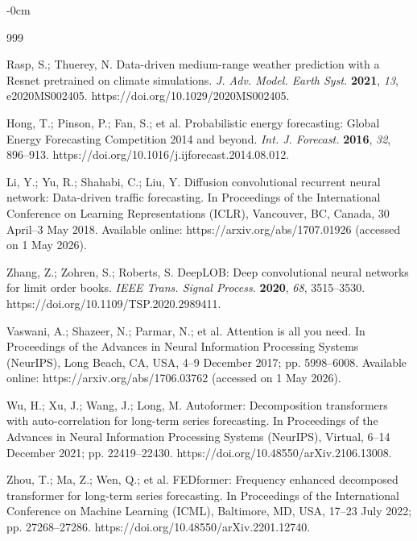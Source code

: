 \documentclass[electronics,article,submit,pdftex,moreauthors]{Definitions/mdpi}
\begin{document}
\begin{adjustwidth}{-\extralength}{0cm}


\begin{thebibliography}{999}

Rasp, S.; Thuerey, N. Data-driven medium-range weather prediction with a Resnet pretrained on climate simulations. \textit{J. Adv. Model. Earth Syst.} \textbf{2021}, \textit{13}, e2020MS002405. https://doi.org/10.1029/2020MS002405.

Hong, T.; Pinson, P.; Fan, S.; et al. Probabilistic energy forecasting: Global Energy Forecasting Competition 2014 and beyond. \textit{Int. J. Forecast.} \textbf{2016}, \textit{32}, 896--913. https://doi.org/10.1016/j.ijforecast.2014.08.012.

Li, Y.; Yu, R.; Shahabi, C.; Liu, Y. Diffusion convolutional recurrent neural network: Data-driven traffic forecasting. In Proceedings of the International Conference on Learning Representations (ICLR), Vancouver, BC, Canada, 30 April--3 May 2018. Available online: https://arxiv.org/abs/1707.01926 (accessed on 1 May 2026).

Zhang, Z.; Zohren, S.; Roberts, S. DeepLOB: Deep convolutional neural networks for limit order books. \textit{IEEE Trans. Signal Process.} \textbf{2020}, \textit{68}, 3515--3530. https://doi.org/10.1109/TSP.2020.2989411.

Vaswani, A.; Shazeer, N.; Parmar, N.; et al. Attention is all you need. In Proceedings of the Advances in Neural Information Processing Systems (NeurIPS), Long Beach, CA, USA, 4--9 December 2017; pp. 5998--6008. Available online: https://arxiv.org/abs/1706.03762 (accessed on 1 May 2026).

Wu, H.; Xu, J.; Wang, J.; Long, M. Autoformer: Decomposition transformers with auto-correlation for long-term series forecasting. In Proceedings of the Advances in Neural Information Processing Systems (NeurIPS), Virtual, 6--14 December 2021; pp. 22419--22430. https://doi.org/10.48550/arXiv.2106.13008.

Zhou, T.; Ma, Z.; Wen, Q.; et al. FEDformer: Frequency enhanced decomposed transformer for long-term series forecasting. In Proceedings of the International Conference on Machine Learning (ICML), Baltimore, MD, USA, 17--23 July 2022; pp. 27268--27286. https://doi.org/10.48550/arXiv.2201.12740.


\end{thebibliography}
\end{adjustwidth}
\end{document}
